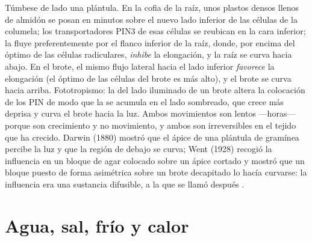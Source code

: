 \begin{example}\label{ex:b3:plant-molecular-physiology:tropism}
Túmbese de lado una plántula. En la cofia de la raíz, unos plastos
densos llenos de almidón se posan en minutos sobre el nuevo lado
inferior de las células de la columela; los transportadores PIN3 de
esas células se reubican en la cara inferior; la  fluye
preferentemente por el flanco inferior de la raíz, donde, por encima
del óptimo de las células radiculares, \emph{inhibe} la elongación, y
la raíz se curva hacia abajo. En el brote, el mismo flujo lateral hacia
el lado inferior \emph{favorece} la elongación (el óptimo de las
células del brote es más alto), y el brote se curva hacia arriba.
Fototropismo: la  del lado iluminado de un brote altera la
colocación de los PIN de modo que la  se acumula en el lado
sombreado, que crece más deprisa y curva el brote hacia la luz. Ambos
movimientos son lentos ---horas--- porque son crecimiento y no
movimiento, y ambos son irreversibles en el tejido que ha crecido.
Darwin (1880) mostró que el ápice de una plántula de gramínea percibe
la luz y que la región de debajo se curva; Went (1928) recogió la
influencia en un bloque de agar colocado sobre un ápice cortado y
mostró que un bloque puesto de forma asimétrica sobre un brote
decapitado lo hacía curvarse: la influencia era una sustancia
difusible, a la que se llamó después .
\end{example}

\section{Agua, sal, frío y calor}

